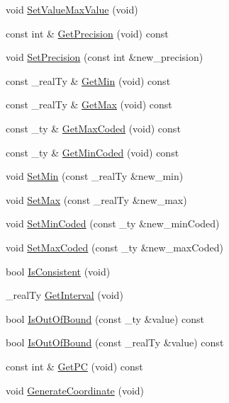 \begin{DoxyCompactItemize}
\item 
void \hyperlink{classcoordinate_a552fb17fcf9a6d74c972020d21e99709}{SetValueMaxValue} (void)
\item 
const int \& \hyperlink{classcoordinate_a92cf59fbfd315c208a5533b68ce3a3d0}{GetPrecision} (void) const 
\item 
void \hyperlink{classcoordinate_a46b633da2fed8687b33814122ad2ce1d}{SetPrecision} (const int \&new\_\-precision)
\item 
const \_\-realTy \& \hyperlink{classcoordinate_ad3a0bad89d7914ec157f773f445edeeb}{GetMin} (void) const 
\item 
const \_\-realTy \& \hyperlink{classcoordinate_af879abf859d6f890045dc6ad558ada96}{GetMax} (void) const 
\item 
const \_\-ty \& \hyperlink{classcoordinate_a06ceabdaa759122e5ea2436a68da951b}{GetMaxCoded} (void) const 
\item 
const \_\-ty \& \hyperlink{classcoordinate_ae5cae8ad8f7c0cd26d4ac1e565c2b72b}{GetMinCoded} (void) const 
\item 
void \hyperlink{classcoordinate_a74810fee94eae241e36552db0041b023}{SetMin} (const \_\-realTy \&new\_\-min)
\item 
void \hyperlink{classcoordinate_a74e0f7eaf59e785c37b2d6f92e6f89a9}{SetMax} (const \_\-realTy \&new\_\-max)
\item 
void \hyperlink{classcoordinate_a7a8c16521bfde82906c7a9013f7ef909}{SetMinCoded} (const \_\-ty \&new\_\-minCoded)
\item 
void \hyperlink{classcoordinate_a8f1612243c59f409ca70878ea572188a}{SetMaxCoded} (const \_\-ty \&new\_\-maxCoded)
\item 
bool \hyperlink{classcoordinate_aa77bd1b22e652f61ced9ff8ef76fcbd9}{IsConsistent} (void)
\item 
\_\-realTy \hyperlink{classcoordinate_aef173b7a32cc1cdb83c35f71a15f2f59}{GetInterval} (void)
\item 
bool \hyperlink{classcoordinate_aa39b86f0c5c09bf06fd5b2b8655d4dc2}{IsOutOfBound} (const \_\-ty \&value) const 
\item 
bool \hyperlink{classcoordinate_a5c05c89e4d5f69ea15ae724e2494bc6c}{IsOutOfBound} (const \_\-realTy \&value) const 
\item 
const int \& \hyperlink{classcoordinate_a08bd46e2f1731b7042718f9c395b768d}{GetPC} (void) const 
\item 
void \hyperlink{classcoordinate_a6ee17f2dd5b36b7bc2fc7b404afb899c}{GenerateCoordinate} (void)
\item 

\end{DoxyCompactItemize}
